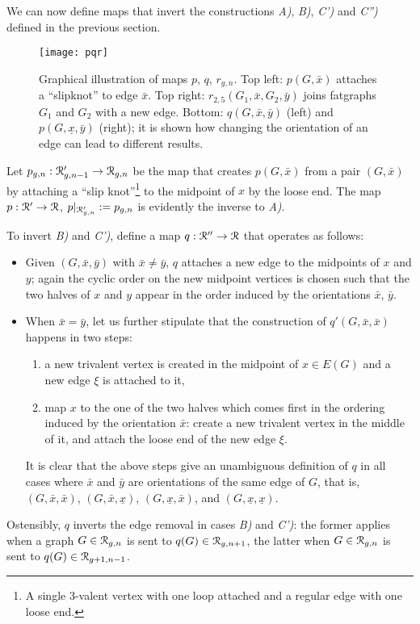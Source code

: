 We can now define maps that invert the constructions {\slshape A)}, {\slshape B)},
{\slshape C')} and {\slshape C'')} defined in the previous section.
\begin{figure}
  \centering
  \texttt{[image: pqr]}
  \caption{Graphical illustration of maps $p$, $q$, $r_{g,n}$.  Top left: $p(G,\bar{x})$ attaches a ``slipknot'' to edge $\bar{x}$.  Top right: $r_{2,5}(G_1, \bar{x}, G_2, \bar{y})$ joins fatgraphs $G_1$ and $G_2$ with a new edge. Bottom: $q(G,\bar{x}, \bar{y})$ (left) and $p(G, \underline{x}, \bar{y})$ (right); it is shown how changing the orientation of an edge can lead to different results.}
  \label{fig:pqr}
\end{figure}

Let $p_{g,n} : \mathcal{R}'_{g,n-1} \to \mathcal{R}_{g,n}$ be the map that creates
$p(G,\bar{x})$ from a pair $(G, \bar{x})$ by attaching a ``slip
knot''\footnote{A single 3-valent vertex with one loop attached and a
  regular edge with one loose end.} to the midpoint of $x$ by the
loose end.  The map $p: \mathcal{R}' \to \mathcal{R}$, $p|_{\mathcal{R}'_{g,n}} := p_{g,n}$ is
evidently the inverse to {\slshape A)}.

To invert {\slshape B)} and {\slshape C')}, define a map $q : \mathcal{R}'' \to \mathcal{R}$ that
operates as follows:
\begin{itemize}
\item Given $(G, \bar{x}, \bar{y})$ with $\bar{x} \not= \bar{y}$, $q$
  attaches a new edge to the midpoints of $x$ and $y$; again the
  cyclic order on the new midpoint vertices is chosen such that the
  two halves of $x$ and $y$ appear in the order induced by the
  orientations $\bar x$, $\bar y$.
\item When $\bar{x} = \bar{y}$, let us further stipulate that the
  construction of $q'(G, \bar{x}, \bar{x})$ happens in two steps:
  \begin{enumerate}
  \item a new trivalent vertex is created in the midpoint of $x \in
    E(G)$ and a new edge $\xi$ is attached to it,
  \item map $x$ to the one of the two halves which comes first in the
    ordering induced by the orientation $\bar{x}$: create a new
    trivalent vertex in the middle of it, and attach the loose end of
    the new edge $\xi$.
  \end{enumerate}
  It is clear that the above steps give an unambiguous definition of
  $q$ in all cases where $\bar{x}$ and $\bar{y}$ are orientations of
  the same edge of $G$, that is, $(G, \bar{x}, \bar{x})$, $(G,
  \bar{x}, \underline{x})$, $(G, \underline{x}, \bar{x})$, and $(G,
  \underline{x}, \underline{x})$.
\end{itemize}
Ostensibly, $q$ inverts the edge removal in cases {\slshape B)} and
{\slshape C')}: the former applies when a graph $G \in \mathcal{R}_{g,n}$ is
sent to $q(G) \in \mathcal{R}_{g,n+1}$, the latter when $G \in \mathcal{R}_{g,n}$ is
sent to $q(G) \in \mathcal{R}_{g+1,n-1}$.

